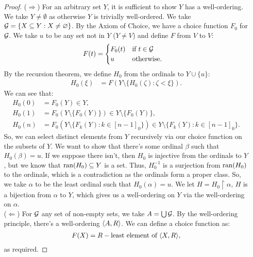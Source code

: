 \begin{proof}
    ($\Longrightarrow$) For an arbitrary set $Y$, it is sufficient to
    show $Y$ has a well-ordering. 
    We take $Y \neq \emptyset$ as otherwise $Y$
    is trivially well-ordered. We take 
    $\mathcal{G} = \{X \subseteq Y : X \neq \varnothing\}$. By the Axiom
    of Choice, we have a choice function $F_0$ for $\mathcal{G}$.
    We take $u$ to be any set not in $Y$ ($Y \neq V$) and
    define $F$ from $V$ to $V$: \begin{align*}
        F(t) &= \begin{cases}
            F_0(t) & \text{if } t \in \mathcal{G} \\
            u      & \text{otherwise}.
        \end{cases}
    \end{align*} By the recursion theorem, we define $H_0$ from
    the ordinals to $Y \cup \{u\}$: \begin{align*}
        H_0(\xi) &= F(Y \setminus \{H_0(\zeta) : \zeta < \xi\}).
    \end{align*} We can see that: \begin{align*}
        H_0(0) &= F_0(Y) \in Y, \\
        H_0(1) &= F_0(Y \setminus \{F_0(Y)\}) \in Y \setminus \{F_0(Y)\}, \\
        H_0(n) &= F_0(Y \setminus \{F_k(Y) : k \in [n - 1]_0\})
            \in Y \setminus \{F_k(Y) : k \in [n - 1]_0\}.
    \end{align*} So, we can select distinct elements from $Y$
    recursively via our choice function on the subsets of $Y$.
    We want to show that there's some ordinal $\beta$ such that
    $H_0(\beta) = u$. If we suppose there isn't, then $H_0$
    is injective from the ordinals to $Y$, but we know
    that $\operatorname{ran}(H_0) \subseteq Y$ is a set. Thus, $H_0^{-1}$ is a 
    surjection from $\operatorname{ran}(H_0)$ to the ordinals, which is a 
    contradiction as the ordinals form a proper class. So,
    we take $\alpha$ to be the least ordinal such that $H_0(\alpha) = u$.
    We let $H = H_0 \upharpoonright \alpha$, $H$ is a bijection
    from $\alpha$ to $Y$, which gives us a well-ordering on $Y$ via the
    well-ordering on $\alpha$.
    \\[\baselineskip]
    ($\Longleftarrow$) For $\mathcal{G}$ any set of non-empty sets, we take
    $A = \bigcup \mathcal{G}$. By the well-ordering principle, there's a
    well-ordering ${\langle A, R \rangle}$. We can define a choice function as: \begin{align*}
        F(X) = R-\text{least element of } {\langle X, R \rangle},
    \end{align*} as required.
\end{proof}

